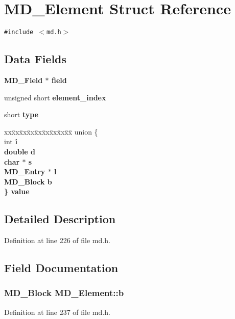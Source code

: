 \section{MD\_\-Element Struct Reference}
\label{structMD__Element}
{\tt \#include $<$md.h$>$}

\subsection*{Data Fields}
\begin{CompactItemize}
\item 
\bf{MD\_\-Field} $\ast$ \bf{field}
\item 
unsigned short \bf{element\_\-index}
\item 
short \bf{type}
\item 
\begin{tabbing}
xx\=xx\=xx\=xx\=xx\=xx\=xx\=xx\=xx\=\kill
union \{\\
\>int \bf{i}\\
\>double \bf{d}\\
\>char $\ast$ \bf{s}\\
\>\bf{MD\_Entry} $\ast$ \bf{l}\\
\>\bf{MD\_Block} \bf{b}\\
\} \bf{value}\\

\end{tabbing}\end{CompactItemize}


\subsection{Detailed Description}




Definition at line 226 of file md.h.

\subsection{Field Documentation}
\subsubsection{\setlength{\rightskip}{0pt plus 5cm}\bf{MD\_\-Block} \bf{MD\_\-Element::b}}\label{structMD__Element_33f55cc45458e038a10628c156eafea9}




Definition at line 237 of file md.h.

